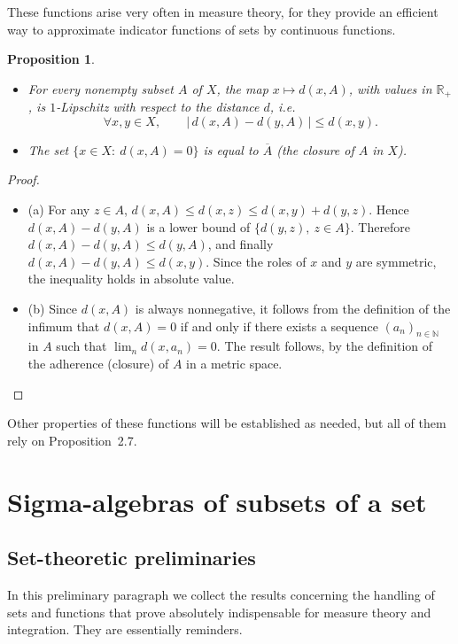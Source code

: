 \documentclass[12pt]{article}
\newtheorem{proposition}{Proposition}[section]
\theoremstyle{definition}
\begin{document}
These functions arise very often in measure theory, for they provide an efficient way to approximate indicator functions of sets by continuous functions.

\begin{proposition}
\begin{itemize}[leftmargin=1.5em]
\item[(a)] For every nonempty subset $A$ of $X$, the map $x\mapsto d(x,A)$, with values in $\mathbb{R}_+$, is $1$-Lipschitz with respect to the distance $d$, i.e.
\[
\forall x,y\in X,\qquad |\,d(x,A)-d(y,A)\,|\le d(x,y).
\]
\item[(b)] The set $\{x\in X:\ d(x,A)=0\}$ is equal to $\overline{A}$ (the closure of $A$ in $X$).
\end{itemize}
\end{proposition}

\begin{proof}
\begin{itemize}
\item (a) For any $z\in A$, $d(x,A)\le d(x,z)\le d(x,y)+d(y,z)$.
Hence $d(x,A)-d(y,A)$ is a lower bound of $\{d(y,z),\ z\in A\}$.
Therefore $d(x,A)-d(y,A)\le d(y,A)$, and finally $d(x,A)-d(y,A)\le d(x,y)$.
Since the roles of $x$ and $y$ are symmetric, the inequality holds in absolute value.

\item (b) Since $d(x,A)$ is always nonnegative, it follows from the definition of the infimum that $d(x,A)=0$ if and only if there exists a sequence $(a_n)_{n\in\mathbb{N}}$ in $A$ such that $\lim_{n} d(x,a_n)=0$.
The result follows, by the definition of the adherence (closure) of $A$ in a metric space.
\end{itemize}
\end{proof}

Other properties of these functions will be established as needed, but all of them rely on Proposition~2.7.

\newpage
\section{Sigma-algebras of subsets of a set}
\subsection{Set-theoretic preliminaries}
In this preliminary paragraph we collect the results concerning the handling of sets and functions that prove absolutely indispensable for measure theory and integration. They are essentially reminders.
\end{document}
